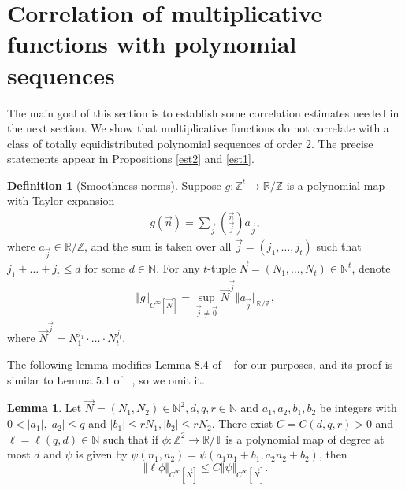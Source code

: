 \documentclass[12pt,amstex]{amsart}
\theoremstyle{definition}
\newtheorem{lem}[thm]{Lemma}
\newtheorem{defn}[thm]{Definition}
\begin{document}
\section{Correlation of multiplicative functions with polynomial sequences}
The main goal of this section is to establish some correlation estimates needed in the next section. We show that multiplicative
functions do not correlate with a class of totally equidistributed polynomial
sequences of order 2. The precise statements appear in Propositions \ref{est2} and \ref{est1}.

\begin{defn}[Smoothness norms]
  Suppose $g\colon\mathbb{Z}^{t}\rightarrow\mathbb{R}/\mathbb{Z}$ is a polynomial map with Taylor expansion
  \begin{equation}\nonumber
  \begin{split}
  g(\vec{n})=\sum_{\vec{j}}\binom{\vec{n}}{\vec{j}}a_{\vec{j}},
  \end{split}
\end{equation}
where $a_{\vec{j}}\in\mathbb{R}/\mathbb{Z}$, and the sum is taken over all $\vec{j}=(j_{1},\dots,j_{t})$ such that $j_{1}+\dots+j_{t}\leq d$ for some $d\in\mathbb{N}$. For any $t$-tuple $\vec{N}=(N_{1},\dots,N_{t})\in\mathbb{N}^{t}$, denote
  \begin{equation}\nonumber
  \begin{split}
  \Vert g\Vert_{C^{\infty}[\vec{N}]}=\sup_{\vec{j}\neq\vec{0}}\vec{N}^{\vec{j}}\Vert a_{\vec{j}}\Vert_{\mathbb{R}/\mathbb{Z}},
  \end{split}
\end{equation}
where $\vec{N}^{\vec{j}}=N_{1}^{j_{1}}\cdot\ldots\cdot N_{t}^{j_{t}}$.
\end{defn}

The following lemma modifies Lemma 8.4 of ~\cite{GT} for our purposes, and its proof is similar to Lemma 5.1 of
~\cite{FH}, so we omit it.
\begin{lem}\label{51}
 Let $\vec{N}=(N_{1},N_{2})\in\mathbb{N}^{2}, d,q,r\in\mathbb{N}$ and $a_{1},a_{2},b_{1},b_{2}$ be
integers with $0<\vert a_{1}\vert, \vert a_{2}\vert\leq q$ and $\vert b_{1}\vert\leq r N_{1}, \vert b_{2}\vert\leq r N_{2}$.
There exist $C=C(d,q,r)>0$ and $\ell=\ell(q,d)\in\mathbb{N}$ such that if
$\phi\colon\mathbb{Z}^{2}\to\mathbb{R}/\mathbb{T}$ is a polynomial map of degree at most $d$ and 
$\psi$ is given by $\psi(n_{1},n_{2})=\psi(a_{1}n_{1}+b_{1},a_{2}n_{2}+b_{2})$, then
$$\Vert\ell\phi\Vert_{C^{\infty}[\vec{N}]}\leq C\Vert\psi\Vert_{C^{\infty}[\vec{N}]}.$$
\end{lem}
 
\end{document}
